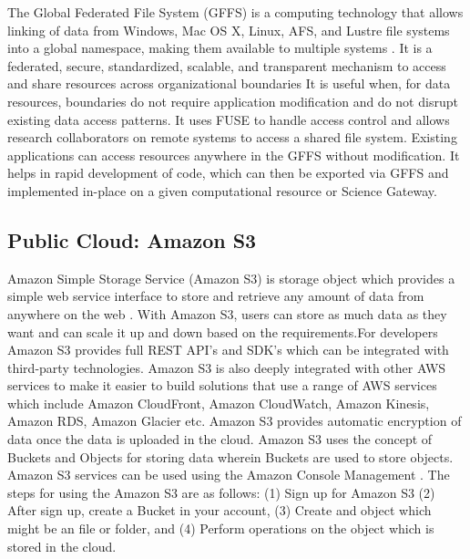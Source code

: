 {     The Global Federated File System (GFFS) is a
     computing technology that allows linking of data from Windows,
     Mac OS X, Linux, AFS, and Lustre file systems into a global
     namespace, making them available to multiple systems \cite{www-gffs}.
     It is a
     federated, secure, standardized, scalable, and transparent
     mechanism to access and share resources across organizational
     boundaries It is useful when, for data resources, boundaries do
     not require application modification and do not disrupt existing
     data access patterns. It uses FUSE to handle access control and
     allows research collaborators on remote systems to access a
     shared file system. Existing applications can access resources
     anywhere in the GFFS without modification. It helps in rapid
     development of code, which can then be exported via GFFS and
     implemented in-place on a given computational resource or Science
     Gateway.

     \pv
     
\subsection{Public Cloud: Amazon S3}

     Amazon Simple Storage Service (Amazon S3) is
     storage object which provides a simple web service interface to
     store and retrieve any amount of data from anywhere on the
     web \cite{www-amazon-s3}. With Amazon S3, users can store as much data as they want
     and can scale it up and down based on the requirements.For
     developers Amazon S3 provides full REST API's and SDK's which can
     be integrated with third-party technologies. Amazon S3 is also
     deeply integrated with other AWS services to make it easier to
     build solutions that use a range of AWS services which include
     Amazon CloudFront, Amazon CloudWatch, Amazon Kinesis, Amazon RDS,
     Amazon Glacier etc. Amazon S3 provides automatic encryption of
     data once the data is uploaded in the cloud. Amazon S3 uses the
     concept of Buckets and Objects for storing data wherein Buckets
     are used to store objects. Amazon S3 services can be used using
     the Amazon Console Management \cite{www-amazon-s3-docs}. The steps
     for using the Amazon S3 are as follows: (1) Sign up for Amazon S3
     (2) After sign up, create a Bucket in your account, (3) Create
     and object which might be an file or folder, and (4) Perform
     operations on the object which is stored in the cloud.

}
